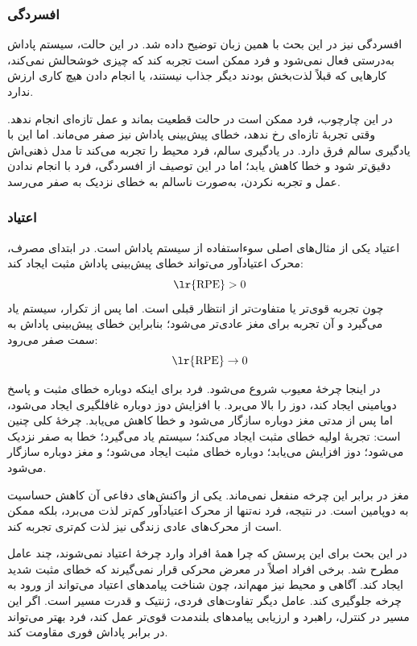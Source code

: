 \subsubsection{افسردگی}
افسردگی نیز در این بحث با همین زبان توضیح داده شد. در این حالت، سیستم پاداش به‌درستی فعال نمی‌شود و فرد ممکن است تجربه کند که چیزی خوشحالش نمی‌کند، کارهایی که قبلاً لذت‌بخش بودند دیگر جذاب نیستند، یا انجام دادن هیچ کاری ارزش ندارد.

در این چارچوب، فرد ممکن است در حالت قطعیت بماند و عمل تازه‌ای انجام ندهد. وقتی تجربهٔ تازه‌ای رخ ندهد، خطای پیش‌بینی پاداش نیز صفر می‌ماند. اما این با یادگیری سالم فرق دارد. در یادگیری سالم، فرد محیط را تجربه می‌کند تا مدل ذهنی‌اش دقیق‌تر شود و خطا کاهش یابد؛ اما در این توصیف از افسردگی، فرد با انجام ندادن عمل و تجربه نکردن، به‌صورت ناسالم به خطای نزدیک به صفر می‌رسد.

\subsubsection{اعتیاد}
اعتیاد یکی از مثال‌های اصلی سوءاستفاده از سیستم پاداش است. در ابتدای مصرف، محرک اعتیادآور می‌تواند خطای پیش‌بینی پاداش مثبت ایجاد کند:
\[
\text{\lr{RPE}} > 0
\]
چون تجربه قوی‌تر یا متفاوت‌تر از انتظار قبلی است. اما پس از تکرار، سیستم یاد می‌گیرد و آن تجربه برای مغز عادی‌تر می‌شود؛ بنابراین خطای پیش‌بینی پاداش به سمت صفر می‌رود:
\[
\text{\lr{RPE}} \rightarrow 0
\]

در اینجا چرخهٔ معیوب شروع می‌شود. فرد برای اینکه دوباره خطای مثبت و پاسخ دوپامینی ایجاد کند، دوز را بالا می‌برد. با افزایش دوز دوباره غافلگیری ایجاد می‌شود، اما پس از مدتی مغز دوباره سازگار می‌شود و خطا کاهش می‌یابد. چرخهٔ کلی چنین است: تجربهٔ اولیه خطای مثبت ایجاد می‌کند؛ سیستم یاد می‌گیرد؛ خطا به صفر نزدیک می‌شود؛ دوز افزایش می‌یابد؛ دوباره خطای مثبت ایجاد می‌شود؛ و مغز دوباره سازگار می‌شود.

مغز در برابر این چرخه منفعل نمی‌ماند. یکی از واکنش‌های دفاعی آن کاهش حساسیت به دوپامین است. در نتیجه، فرد نه‌تنها از محرک اعتیادآور کم‌تر لذت می‌برد، بلکه ممکن است از محرک‌های عادی زندگی نیز لذت کم‌تری تجربه کند.

در این بحث برای این پرسش که چرا همهٔ افراد وارد چرخهٔ اعتیاد نمی‌شوند، چند عامل مطرح شد. برخی افراد اصلاً در معرض محرکی قرار نمی‌گیرند که خطای مثبت شدید ایجاد کند. آگاهی و محیط نیز مهم‌اند، چون شناخت پیامدهای اعتیاد می‌تواند از ورود به چرخه جلوگیری کند. عامل دیگر تفاوت‌های فردی، ژنتیک و قدرت مسیر  است. اگر این مسیر در کنترل، راهبرد و ارزیابی پیامدهای بلندمدت قوی‌تر عمل کند، فرد بهتر می‌تواند در برابر پاداش فوری مقاومت کند.

